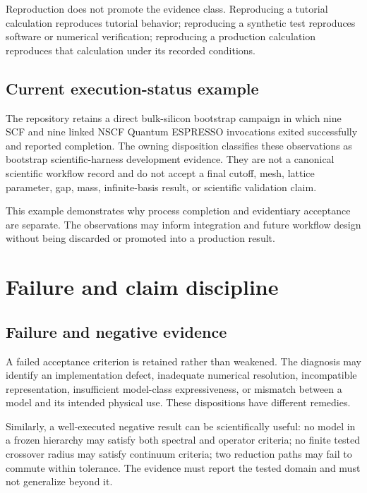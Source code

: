 Reproduction does not promote the evidence class. Reproducing a tutorial
calculation reproduces tutorial behavior; reproducing a synthetic test
reproduces software or numerical verification; reproducing a production
calculation reproduces that calculation under its recorded conditions.


\subsection{Current execution-status example}

The repository retains a direct bulk-silicon bootstrap campaign in which nine
SCF and nine linked NSCF Quantum ESPRESSO invocations exited successfully and
reported completion. The owning disposition classifies these observations as
bootstrap scientific-harness development evidence. They are not a canonical
scientific workflow record and do not accept a final cutoff, mesh, lattice
parameter, gap, mass, infinite-basis result, or scientific validation claim.

This example demonstrates why process completion and evidentiary acceptance are
separate. The observations may inform integration and future workflow design
without being discarded or promoted into a production result.

\section{Failure and claim discipline}

\subsection{Failure and negative evidence}


A failed acceptance criterion is retained rather than weakened. The diagnosis
may identify an implementation defect, inadequate numerical resolution,
incompatible representation, insufficient model-class expressiveness, or
mismatch between a model and its intended physical use. These dispositions have
different remedies.

Similarly, a well-executed negative result can be scientifically useful: no
model in a frozen hierarchy may satisfy both spectral and operator criteria; no
finite tested crossover radius may satisfy continuum criteria; two reduction
paths may fail to commute within tolerance. The evidence must report the tested
domain and must not generalize beyond it.

